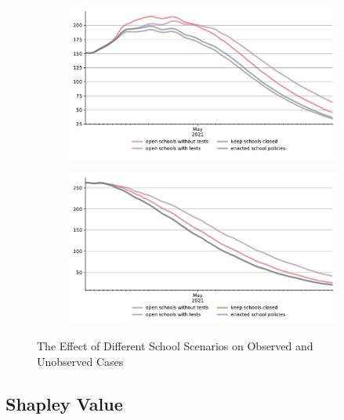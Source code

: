 \begin{figure}[ht]
  \centering
  \begin{subfigure}{.6\textwidth}
    \includegraphics[width=0.9 \textwidth]{../figures/results/figures/scenario_comparisons/school_scenarios/full_new_known_case}
  \end{subfigure}%
  \begin{subfigure}{.6\textwidth}
    \includegraphics[width=0.9 \textwidth]{../figures/results/figures/scenario_comparisons/school_scenarios/full_newly_infected}
  \end{subfigure}
  \caption{The Effect of Different School Scenarios on Observed and Unobserved Cases}
  \label{fig:school_scenarios_detailed}
\end{figure}


\FloatBarrier



\FloatBarrier


\subsection{Shapley Value} %
\label{sub:shapley_value}

